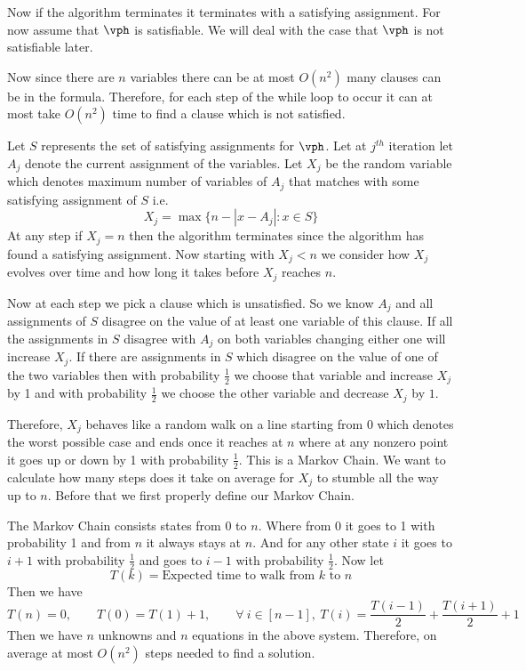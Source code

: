 Now if the algorithm terminates it terminates with a satisfying assignment. For now assume that $\vph$ is satisfiable. We will deal with the case that $\vph$ is not satisfiable later. 

Now since there are $n$ variables there can be at most $O(n^2)$ many clauses can be in the formula. Therefore, for each step of the while loop to occur it can at most take $O(n^2)$ time to find a clause which is not satisfied.

Let $S$ represents the set of satisfying assignments for $\vph$. Let at $j^{th}$ iteration let $A_j$ denote the current assignment of the variables. Let $X_j$ be the random variable which denotes maximum number of variables of $A_j$ that matches with some satisfying assignment of $S$ i.e. $$X_j=\max\{n-|x-A_j|\colon x\in S\}$$At any step if $X_j=n$ then the algorithm terminates since the algorithm has found a satisfying assignment. Now starting with $X_j<n$ we consider how $X_j$ evolves over time and how long it takes before $X_j$ reaches $n$.

Now at each step we pick a clause which is unsatisfied. So we know $A_j$ and all assignments of $S$ disagree on the value of at least one variable of this clause. If all the assignments in $S$ disagree with $A_j$ on both variables changing either one will increase $X_j$. If there are assignments in $S$ which disagree on the value of one of the two variables then with probability $\frac12$ we choose that variable and increase $X_j$ by 1 and with probability $\frac12$ we choose the other variable and decrease $X_j$ by $1$.

Therefore, $X_j$ behaves like a random walk on a line starting from $0$ which denotes the worst possible case and ends once it reaches at $n$ where at any nonzero point it goes up or down by 1 with probability $\frac12$. This is a Markov Chain. We want to calculate how many steps does it take on average for $X_j$ to stumble all the way up to $n$. Before that we first properly define our Markov Chain.

The Markov Chain consists states from $0 $ to $n$. Where from 0 it goes to 1 with probability 1 and from $n$ it always stays at $n$. And for any other state $i$ it goes to $i+1$ with probability $\frac12$ and goes to $i-1$ with probability $\frac12$. Now let $$T(k)=\text{Expected time to walk from $k$ to $n$}$$ Then we have $$T(n)=0,\qquad T(0)=T(1)+1, \qquad\forall\ i\in [n-1],\ T(i)=\frac{T(i-1)}{2}+\frac{T(i+1)}2+1$$Then we have $n$ unknowns and $n$ equations in the above system. Therefore, on average at most $O(n^2)$ steps needed to find a solution.

